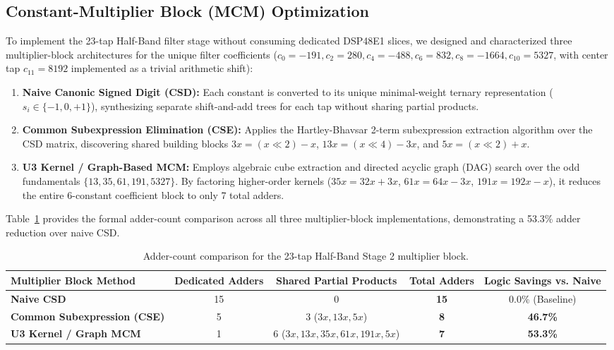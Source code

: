 \documentclass[11pt,a4paper]{article}
\begin{document}
\subsection{Constant-Multiplier Block (MCM) Optimization}
\label{sec:mcm}
To implement the 23-tap Half-Band filter stage without consuming dedicated DSP48E1 slices, we designed and characterized three multiplier-block architectures for the unique filter coefficients ($c_0 = -191, c_2 = 280, c_4 = -488, c_6 = 832, c_8 = -1664, c_{10} = 5327$, with center tap $c_{11} = 8192$ implemented as a trivial arithmetic shift):
\begin{enumerate}
  \item \textbf{Naive Canonic Signed Digit (CSD):} Each constant is converted to its unique minimal-weight ternary representation ($s_i \in \{-1, 0, +1\}$), synthesizing separate shift-and-add trees for each tap without sharing partial products.
  \item \textbf{Common Subexpression Elimination (CSE):} Applies the Hartley-Bhavsar 2-term subexpression extraction algorithm over the CSD matrix, discovering shared building blocks $3x = (x \ll 2) - x$, $13x = (x \ll 4) - 3x$, and $5x = (x \ll 2) + x$.
  \item \textbf{U3 Kernel / Graph-Based MCM:} Employs algebraic cube extraction and directed acyclic graph (DAG) search over the odd fundamentals $\{13, 35, 61, 191, 5327\}$. By factoring higher-order kernels ($35x = 32x + 3x$, $61x = 64x - 3x$, $191x = 192x - x$), it reduces the entire 6-constant coefficient block to only 7 total adders.
\end{enumerate}

Table~\ref{tab:mcm_comparison} provides the formal adder-count comparison across all three multiplier-block implementations, demonstrating a 53.3\% adder reduction over naive CSD.

\begin{table}[H]\centering\small
\caption{Adder-count comparison for the 23-tap Half-Band Stage 2 multiplier block.}\label{tab:mcm_comparison}
\begin{tabular}{@{}lcccc@{}}
\toprule
Multiplier Block Method & Dedicated Adders & Shared Partial Products & Total Adders & Logic Savings vs. Naive\\
\midrule
\textbf{Naive CSD} & 15 & 0 & \textbf{15} & 0.0\% (Baseline)\\
\textbf{Common Subexpression (CSE)} & 5 & 3 ($3x, 13x, 5x$) & \textbf{8} & \textbf{46.7\%}\\
\textbf{U3 Kernel / Graph MCM} & 1 & 6 ($3x, 13x, 35x, 61x, 191x, 5x$) & \textbf{7} & \textbf{53.3\%}\\
\bottomrule
\end{tabular}
\end{table}
\end{document}

